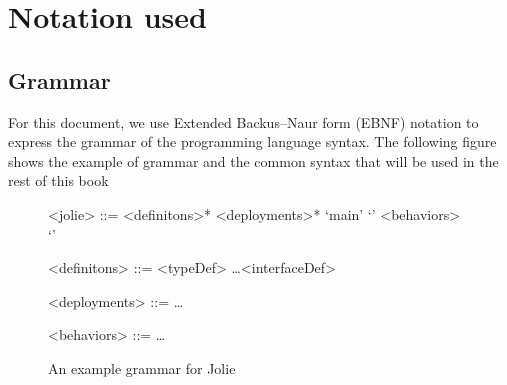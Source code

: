 \section*{Notation used}

\subsection*{Grammar}

For this document, we use Extended Backus–Naur form (EBNF) notation to express the grammar of the programming language syntax. The following figure shows the example of grammar and the common syntax that will be used in the rest of this book 
\begin{figure}[h!]
    \begin{framed}
        \begin{grammar}
            <jolie> ::= <definitons>* <deployments>*  `main' `{' <behaviors> `}'

            <definitons> ::= <typeDef> \alt \dots \alt <interfaceDef> 

            <deployments> ::= \dots

            <behaviors> ::= \dots
        \end{grammar}
    \end{framed}
    \caption{An example grammar for Jolie}
\end{figure}